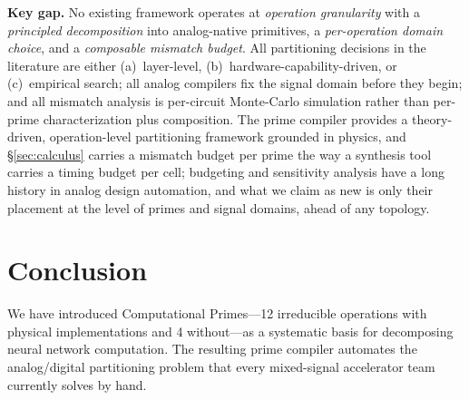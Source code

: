 \documentclass[11pt]{article}
\begin{document}
\textbf{Key gap.} No existing framework operates at \textit{operation granularity} with a \textit{principled decomposition} into analog-native primitives, a \textit{per-operation domain choice}, and a \textit{composable mismatch budget}. All partitioning decisions in the literature are either (a)~layer-level, (b)~hardware-capability-driven, or (c)~empirical search; all analog compilers fix the signal domain before they begin; and all mismatch analysis is per-circuit Monte-Carlo simulation rather than per-prime characterization plus composition. The prime compiler provides a theory-driven, operation-level partitioning framework grounded in physics, and \S\ref{sec:calculus} carries a mismatch budget per prime the way a synthesis tool carries a timing budget per cell; budgeting and sensitivity analysis have a long history in analog design automation, and what we claim as new is only their placement at the level of primes and signal domains, ahead of any topology.

\section{Conclusion}

We have introduced Computational Primes---12 irreducible operations with physical implementations and 4 without---as a systematic basis for decomposing neural network computation. The resulting prime compiler automates the analog/digital partitioning problem that every mixed-signal accelerator team currently solves by hand.
\end{document}
